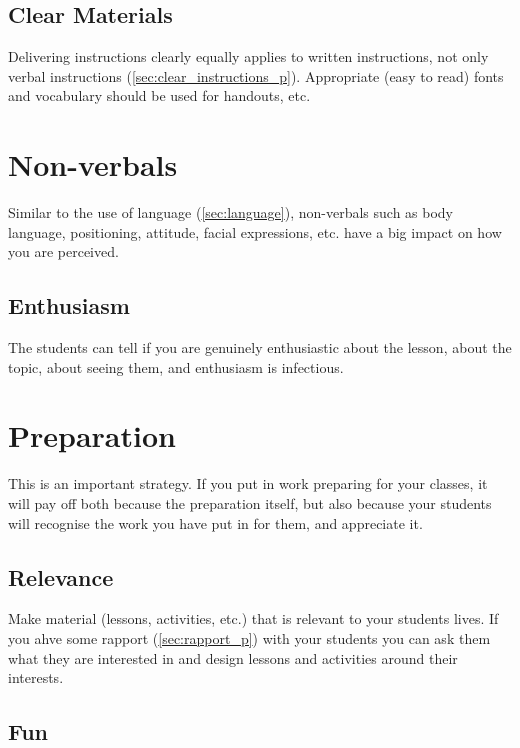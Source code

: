 \documentclass[12pt]{report}
\begin{document}
\subsection{Clear Materials}
\label{sec:clear_materials_p}

Delivering instructions clearly equally applies to written instructions, not only verbal instructions (\ref{sec:clear_instructions_p}). Appropriate (easy to read) fonts and vocabulary should be used for handouts, etc.



\section{Non-verbals}
\label{sec:non_verbals_p}

Similar to the use of language (\ref{sec:language}), non-verbals such as body language, positioning, attitude, facial expressions, etc. have a big impact on how you are perceived. 

\subsection{Enthusiasm}
\label{sec:enthusiasm_p}

The students can tell if you are genuinely enthusiastic about the lesson, about the topic, about seeing them, and enthusiasm is infectious.



\section{Preparation}
\label{sec:preparation_p}

This is an important strategy. If you put in work preparing for your classes, it will pay off both because the preparation itself, but also because your students will recognise the work you have put in for them, and appreciate it. 

\subsection{Relevance}
\label{sec:relevance_p}

Make material (lessons, activities, etc.) that is relevant to your students lives. If you ahve some rapport (\ref{sec:rapport_p}) with your students you can ask them what they are interested in and design lessons and activities around their interests.

\subsection{Fun}
\label{sec:fun_p}
\end{document}
